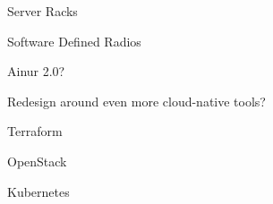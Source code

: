 \begin{outline}
\begin{outline}
\begin{outline}
\begin{outline}
                \item Server Racks
                \item Software Defined Radios
            \end{outline}
            \item Ainur 2.0?
            \begin{outline}
                \item Redesign around even more cloud-native tools?
                \item Terraform
                \item OpenStack
                \item Kubernetes
            \end{outline}
        \end{outline}
    \end{outline}
\end{outline}
